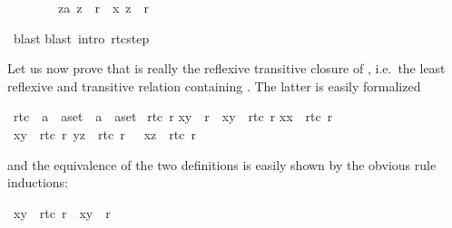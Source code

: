 \begin{isabellebody}
\begin{isamarkuptxt}
\begin{isabelle}
\ \ \ \ \ \ \ {\isasymLongrightarrow}\ {\isacharparenleft}za{\isacharcomma}\ z{\isacharparenright}\ {\isasymin}\ r{\isacharasterisk}\ {\isasymlongrightarrow}\ {\isacharparenleft}x{\isacharcomma}\ z{\isacharparenright}\ {\isasymin}\ r{\isacharasterisk}%
\end{isabelle}%
\end{isamarkuptxt}%
\ blast{\isacharparenright}\isanewline
{}blast\ intro{\isacharcolon}\ rtc{\isacharunderscore}step{\isacharparenright}\isanewline
{}%
\begin{isamarkuptext}%
Let us now prove that  is really the reflexive transitive closure
of , i.e.\ the least reflexive and transitive
relation containing . The latter is easily formalized%
\end{isamarkuptext}%
\ rtc{}\ {\isacharcolon}{\isacharcolon}\ {\isachardoublequote}{\isacharparenleft}{\isacharprime}a\ {\isasymtimes}\ {\isacharprime}a{\isacharparenright}set\ {\isasymRightarrow}\ {\isacharparenleft}{\isacharprime}a\ {\isasymtimes}\ {\isacharprime}a{\isacharparenright}set{\isachardoublequote}\isanewline
{}\ {\isachardoublequote}rtc{}\ r{\isachardoublequote}\isanewline
{}\isanewline
{\isachardoublequote}{\isacharparenleft}x{\isacharcomma}y{\isacharparenright}\ {\isasymin}\ r\ {\isasymLongrightarrow}\ {\isacharparenleft}x{\isacharcomma}y{\isacharparenright}\ {\isasymin}\ rtc{}\ r{\isachardoublequote}\isanewline
{\isachardoublequote}{\isacharparenleft}x{\isacharcomma}x{\isacharparenright}\ {\isasymin}\ rtc{}\ r{\isachardoublequote}\isanewline
{\isachardoublequote}{\isasymlbrakk}\ {\isacharparenleft}x{\isacharcomma}y{\isacharparenright}\ {\isasymin}\ rtc{}\ r{\isacharsemicolon}\ {\isacharparenleft}y{\isacharcomma}z{\isacharparenright}\ {\isasymin}\ rtc{}\ r\ {\isasymrbrakk}\ {\isasymLongrightarrow}\ {\isacharparenleft}x{\isacharcomma}z{\isacharparenright}\ {\isasymin}\ rtc{}\ r{\isachardoublequote}%
\begin{isamarkuptext}%
\noindent
and the equivalence of the two definitions is easily shown by the obvious rule
inductions:%
\end{isamarkuptext}%
\ {\isachardoublequote}{\isacharparenleft}x{\isacharcomma}y{\isacharparenright}\ {\isasymin}\ rtc{}\ r\ {\isasymLongrightarrow}\ {\isacharparenleft}x{\isacharcomma}y{\isacharparenright}\ {\isasymin}\ r{\isacharasterisk}{\isachardoublequote}\isanewline

\end{isabellebody}
